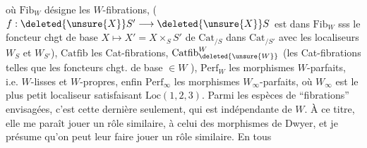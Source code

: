 
où $\mathrm{Fib}_W$ désigne les $W$-fibrations,
($f:\deleted{\unsure{X}}S'\longrightarrow\deleted{\unsure{X}}S$ est dans $\mathrm{Fib}_W$ sss le foncteur
chgt de base $X\longmapsto X'=X\times_S S'$ de $\mathrm{Cat}_{/S}$ dans
$\mathrm{Cat}_{/S'}$   avec les localiseurs
$W_S$ et $W_{S'}$), $\mathrm{Catfib}$ les Cat-fibrations,
$\mathrm{Catfib}^{W}_{\deleted{\unsure{W}}}$ 
(les Cat-fibrations telles que les
foncteurs chgt. de base   $\in W$
),
$\mathrm{Perf}_W$ les morphismes $W$-parfaits, i.e.
$W$-lisses et $W$-propres, enfin $\mathrm{Perf}_\infty$ les
morphismes $W_\infty$-parfaits, où $W_\infty$ est
le plus petit localiseur satisfaisant
$\mathrm{Loc}(1,2,3)$. Parmi les  espèces de
``fibrations'' envisagées, c'est cette dernière
seulement,  qui est indépendante de $W$.
À ce titre, elle me paraît jouer un
rôle similaire,  à celui des morphismes
de Dwyer,  et je présume qu'on peut leur
faire jouer un rôle similaire. En tous
